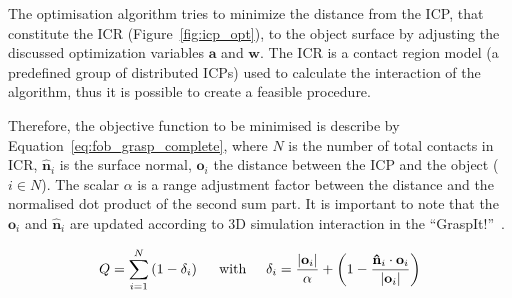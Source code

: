 The optimisation algorithm tries to minimize the distance from the \ac{ICP}, that constitute the \ac{ICR} (Figure~\ref{fig:icp_opt}), to the object surface by adjusting the discussed optimization variables $\mathbf{a}$ and $\mathbf{w}$. The \ac{ICR} is a contact region model (a predefined group of distributed \acp{ICP}) used to calculate the interaction of the algorithm, thus it is possible to create a feasible procedure. 

Therefore, the objective function to be minimised is describe by Equation~\ref{eq:fob_grasp_complete}, where $N$ is the number of total contacts in \ac{ICR}, $\mathbf{\hat{n}}_{i}$ is the surface normal, $\mathbf{o}_{i}$ the distance between the \ac{ICP} and the object ($i \in N$). The scalar $\alpha$ is a range adjustment factor between the distance and the normalised dot product of the second sum part. It is important to note that the $\mathbf{o}_{i}$ and $\mathbf{\hat{n}}_{i}$ are updated according to 3D simulation interaction in the ``GraspIt!''~\cite{AndrewT2004}. %

\begin{equation}
Q=\sum_{i=1}^{N}\left(1-\delta_{i}\right)\hspace{0.5cm}\textnormal{with}\hspace{0.5cm}\delta_{i}=\frac{\left|\mathbf{o}_{i}\right|}{\alpha}+\left(1-\frac{\mathbf{\hat{n}}_{i} \cdot\mathbf{o}_{i}}{\left|\mathbf{o}_{i}\right|}\right)
\label{eq:fob_grasp_complete}
\end{equation}


\begin{figure}[h!] %
\end{figure}


